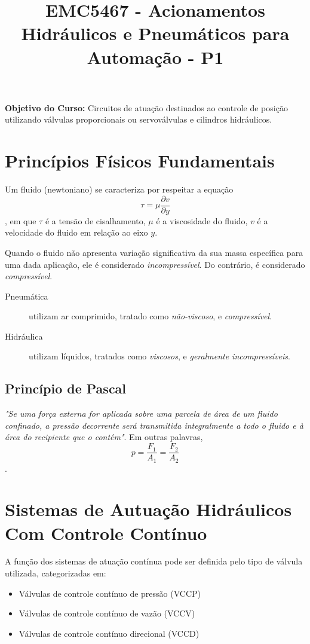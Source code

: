 \documentclass[a4paper]{report}
\title{EMC5467 - Acionamentos Hidráulicos e Pneumáticos para Automação - P1}
\begin{document}
\textbf{Objetivo do Curso:}
Circuitos de atuação destinados ao controle de posição utilizando válvulas proporcionais ou servoválvulas e cilindros hidráulicos.

\section*{Princípios Físicos Fundamentais}

Um fluido (newtoniano) se caracteriza por respeitar a equação \[
\tau = \mu \frac{\partial v}{\partial y} 
\], em que $\tau$ é a tensão de cisalhamento, $\mu$ é a viscosidade do fluido, $v$ é a velocidade do fluido em relação ao eixo $y$.

Quando o fluido não apresenta variação significativa da sua massa específica para uma dada aplicação, ele é considerado \emph{incompressível}. Do contrário, é considerado \emph{compressível}.

\begin{description}
    \item[Pneumática] utilizam ar comprimido, tratado como \emph{não-viscoso}, e \emph{compressível}.
    \item[Hidráulica] utilizam líquidos, tratados como \emph{viscosos}, e \emph{geralmente incompressíveis}.
\end{description}

\subsection*{Princípio de Pascal}

\emph{"Se uma força externa for aplicada sobre uma parcela de área de um fluido confinado, a pressão decorrente será transmitida integralmente a todo o fluido e à área do recipiente que o contém"}. Em outras palavras, \[
p = \frac{F_1}{A_1} = \frac{F_2}{A_2}
\].

\section*{Sistemas de Autuação Hidráulicos Com Controle Contínuo}

A função dos sistemas de atuação contínua pode ser definida pelo tipo de válvula utilizada, categorizadas em:
\begin{itemize}
    \item Válvulas de controle contínuo de pressão (VCCP)
    \item Válvulas de controle contínuo de vazão (VCCV)
    \item Válvulas de controle contínuo direcional (VCCD)
\end{itemize}
\end{document}
